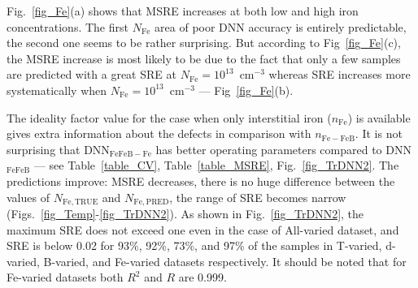 \documentclass[num-refs]{wiley-article} %
\begin{document}
Fig.~\ref{fig_Fe}(a) shows that MSRE increases at both low and high iron concentrations.
The first $N_\mathrm{Fe}$ area of poor DNN accuracy is entirely predictable,
the second one seems to be rather surprising.
But according to Fig~\ref{fig_Fe}(c), the MSRE increase is most likely to be due to the fact
that only a few samples are predicted with a great SRE
at $N_\mathrm{Fe}=10^{13}$~cm$^{-3}$
whereas SRE increases more systematically when $N_\mathrm{Fe}=10^{13}$~cm$^{-3}$ --- Fig~\ref{fig_Fe}(b).

The ideality factor value for the case when only interstitial iron ($n_\mathrm{Fe}$)
is available gives extra information about the defects in comparison with $n_\mathrm{Fe-FeB}$.
It is not surprising that DNN$_\mathrm{FeFeB-Fe}$ has better operating parameters compared to
DNN$_\mathrm{FeFeB}$ --- see Table~\ref{table_CV}, Table~\ref{table_MSRE}, Fig.~\ref{fig_TrDNN2}.
The predictions improve:
MSRE decreases,
there is no huge difference between the values of $N_\mathrm{Fe,TRUE}$ and $N_\mathrm{Fe,PRED}$,
the range of SRE becomes  narrow
(Figs.~\ref{fig_Temp}-\ref{fig_TrDNN2}).
As shown in Fig.~\ref{fig_TrDNN2}, the maximum SRE does not exceed one even in the case of All-varied dataset,
and SRE is below 0.02 for 93\%, 92\%, 73\%, and 97\% of the samples in T-varied, d-varied, B-varied, and Fe-varied datasets respectively.
It should be noted that  for Fe-varied datasets both $R^2$ and  $R$  are 0.999.
\end{document}
